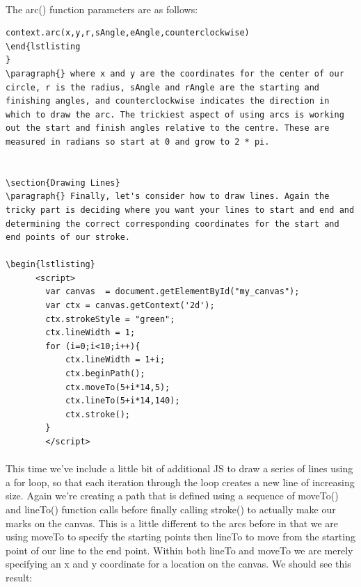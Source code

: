 \paragraph{} The arc() function parameters are as follows:

\begin{lstlisting}
context.arc(x,y,r,sAngle,eAngle,counterclockwise)
\end{lstlisting
}
\paragraph{} where x and y are the coordinates for the center of our circle, r is the radius, sAngle and rAngle are the starting and finishing angles, and counterclockwise indicates the direction in which to draw the arc. The trickiest aspect of using arcs is working out the start and finish angles relative to the centre. These are measured in radians so start at 0 and grow to 2 * pi.


\section{Drawing Lines}
\paragraph{} Finally, let's consider how to draw lines. Again the tricky part is deciding where you want your lines to start and end and determining the correct corresponding coordinates for the start and end points of our stroke.

\begin{lstlisting}
      <script>
        var canvas  = document.getElementById("my_canvas");
        var ctx = canvas.getContext('2d');
        ctx.strokeStyle = "green";
        ctx.lineWidth = 1;
        for (i=0;i<10;i++){
            ctx.lineWidth = 1+i;
            ctx.beginPath();
            ctx.moveTo(5+i*14,5);
            ctx.lineTo(5+i*14,140);
            ctx.stroke();
        }
        </script>
\end{lstlisting}

\paragraph{} This time we've include a little bit of additional JS to draw a series of lines using a for loop, so that each iteration through the loop creates a new line of increasing size. Again we're creating a path that is defined using a sequence of moveTo() and lineTo() function calls before finally calling stroke() to actually make our marks on the canvas. This is a little different to the arcs before in that we are using moveTo to specify the starting points then lineTo to move from the starting point of our line to the end point. Within both lineTo and moveTo we are merely specifying an x and y coordinate for a location on the canvas. We should see this result:

